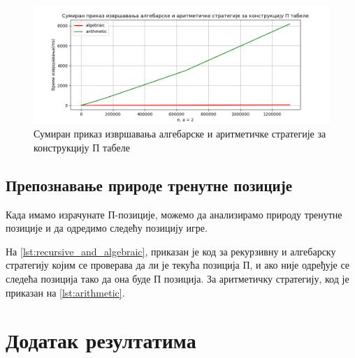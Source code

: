 \documentclass[a4paper]{article}
\begin{document}
\begin{figure}[H]
	\caption{Сумиран приказ извршавања алгебарске и аритметичке стратегије за конструкцију П табеле}
	\label{fig:algebraicVSarithmetic}
	\begin{center}
		\includegraphics[width=\textwidth]{algebraicVSarithmetic.png}
	\end{center}
\end{figure}

\subsection{Препознавање природе тренутне позиције}

Када имамо израчунате П-позиције, можемо да анализирамо природу тренутне позиције и да одредимо следећу позицију игре.

На \ref{lst:recursive_and_algebraic}, приказан је код за рекурзивну и алгебарску стратегију којим се проверава да ли је текућа позиција П, и ако није одређује се следећа позиција тако да она буде П позиција.
За аритметичку стратегију, код је приказан на \ref{lst:arithmetic}.





\newpage
\appendix
\section{Додатак резултатима}



\newpage
{}
\appendix
 

\end{document}
